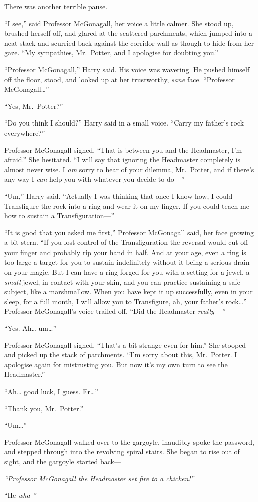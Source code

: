 There was another terrible pause.

``I see,'' said Professor McGonagall, her voice a little calmer. She
stood up, brushed herself off, and glared at the scattered parchments,
which jumped into a neat stack and scurried back against the corridor
wall as though to hide from her gaze. ``My sympathies, Mr.~Potter, and I
apologise for doubting you.''

``Professor McGonagall,'' Harry said. His voice was wavering. He pushed
himself off the floor, stood, and looked up at her trustworthy,
\emph{sane} face. ``Professor McGonagall\ldots{}''

``Yes, Mr.~Potter?''

``Do you think I should?'' Harry said in a small voice. ``Carry my
father's rock everywhere?''

Professor McGonagall sighed. ``That is between you and the Headmaster,
I'm afraid.'' She hesitated. ``I will say that ignoring the Headmaster
completely is almost never wise. I \emph{am} sorry to hear of your
dilemma, Mr.~Potter, and if there's any way I \emph{can} help you with
whatever you decide to do---''

``Um,'' Harry said. ``Actually I was thinking that once I know how, I
could Transfigure the rock into a ring and wear it on my finger. If you
could teach me how to sustain a Transfiguration---''

``It is good that you asked me first,'' Professor McGonagall said, her
face growing a bit stern. ``If you lost control of the Transfiguration
the reversal would cut off your finger and probably rip your hand in
half. And at your age, even a ring is too large a target for you to
sustain indefinitely without it being a serious drain on your magic. But
I can have a ring forged for you with a setting for a jewel, a
\emph{small} jewel, in contact with your skin, and you can practice
sustaining a safe subject, like a marshmallow. When you have kept it up
successfully, even in your sleep, for a full month, I will allow you to
Transfigure, ah, your father's rock\ldots{}'' Professor McGonagall's
voice trailed off. ``Did the Headmaster \emph{really---''}

``Yes. Ah\ldots{} um\ldots{}''

Professor McGonagall sighed. ``That's a bit strange even for him.'' She
stooped and picked up the stack of parchments. ``I'm sorry about this,
Mr.~Potter. I apologise again for mistrusting you. But now it's my own
turn to see the Headmaster.''

``Ah\ldots{} good luck, I guess. Er\ldots{}''

``Thank you, Mr.~Potter.''

``Um\ldots{}''

Professor McGonagall walked over to the gargoyle, inaudibly spoke the
password, and stepped through into the revolving spiral stairs. She
began to rise out of sight, and the gargoyle started back---

\emph{``Professor McGonagall the Headmaster set fire to a chicken!''}

``He \emph{wha-''}
